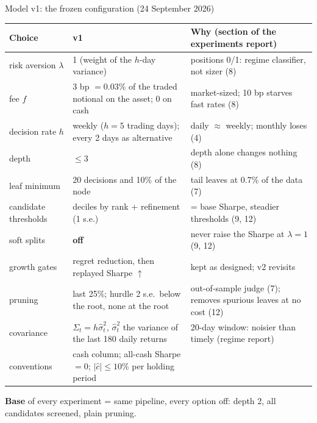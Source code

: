 \documentclass[10pt,aspectratio=169]{beamer}
\newcommand{\1}{\mathbf{1}}
\begin{document}
\begin{frame}{Model v1: the frozen configuration (24 September 2026)}
\scriptsize
\begin{tabular}{@{}p{2.4cm} p{4.6cm} p{6.4cm}@{}}
\toprule
Choice & v1 & Why (section of the experiments report) \\
\midrule
risk aversion $\lambda$ & 1 (weight of the $h$-day variance) & positions 0/1: regime classifier, not sizer (8)\\
fee $f$ & 3 bp $=0.03\%$ of the traded notional on the asset; 0 on cash & market-sized; 10 bp starves fast rates (8)\\
decision rate $h$ & weekly ($h=5$ trading days); every 2 days as alternative & daily $\approx$ weekly; monthly loses (4)\\
depth & $\le3$ & depth alone changes nothing (8)\\
leaf minimum & 20 decisions and 10\% of the node & tail leaves at 0.7\% of the data (7)\\
candidate thresholds & deciles by rank + refinement (1 s.e.) & = base Sharpe, steadier thresholds (9, 12)\\
soft splits & \textbf{off} & never raise the Sharpe at $\lambda=1$ (9, 12)\\
growth gates & regret reduction, then replayed Sharpe $\uparrow$ & kept as designed; v2 revisits\\
pruning & last 25\%; hurdle 2 s.e.\ below the root, none at the root & out-of-sample judge (7); removes spurious leaves at no cost (12)\\
covariance & $\Sigma_t=h\hat\sigma_t^2$, $\hat\sigma_t^2$ the variance of the last 180 daily returns & 20-day window: noisier than timely (regime report)\\
conventions & cash column; all-cash Sharpe $=0$; $|\hat c|\le10\%$ per holding period & \\
\bottomrule
\end{tabular}

\medskip
\textbf{Base} of every experiment = same pipeline, every option off: depth 2, all candidates screened, plain pruning.
\end{frame}
\end{document}

